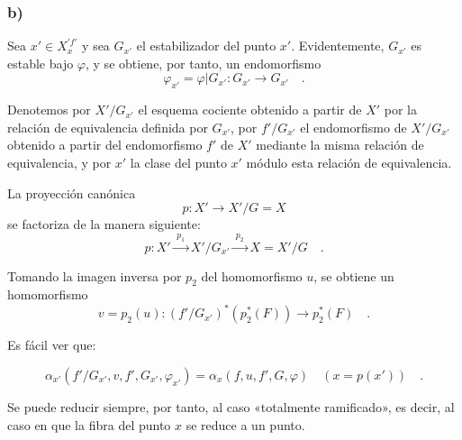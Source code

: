 \subsubsection*{b)} Sea $x'\in X_x^{\prime f'}$ y sea $G_{x'}$ el estabilizador del punto $x'$. Evidentemente, $G_{x'}$ es estable bajo $\varphi$, y se obtiene, por tanto, un endomorfismo
\[
\varphi_{x'} = \varphi|G_{x'} : G_{x'} \longrightarrow G_{x'} \quad .
\]

Denotemos por $X'/G_{x'}$ el esquema cociente obtenido a partir de $X'$ por la relación de equivalencia definida por $G_{x'}$, por $f'/G_{x'}$ el endomorfismo de $X'/G_{x'}$ obtenido a partir del endomorfismo $f'$ de $X'$ mediante la misma relación de equivalencia, y por $x'$ la clase del punto $x'$ módulo esta relación de equivalencia.%

La proyección canónica
\[
p : X' \longrightarrow X'/G = X
\]
se factoriza de la manera siguiente:
\[
p : X' \xrightarrow{\;p_1\;} X'/G_{x'} \xrightarrow{\;p_2\;} X = X'/G \quad .
\]

Tomando la imagen inversa por $p_2$ del homomorfismo $u$, se obtiene un homomorfismo
\[
v = p_2(u) : (f'/G_{x'})^*(p_2^*(F)) \longrightarrow p_2^*(F) \quad .
\]

Es fácil ver que:

\begin{equation}\tag{6.4.3}
\alpha_{x'}(f'/G_{x'}, v, f', G_{x'}, \varphi_{x'}) = \alpha_x(f,u, f', G, \varphi) \quad (x = p(x')) \quad .
\end{equation}

Se puede reducir siempre, por tanto, al caso «totalmente ramificado», es decir, al caso en que la fibra del punto $x$ se reduce a un punto.
